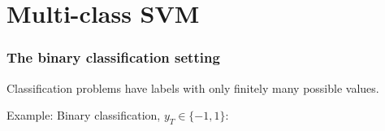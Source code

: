\section{Multi-class SVM}


\begin{frame}\frametitle{The binary classification setting}


Classification problems have labels with only finitely many possible values.

Example: Binary classification, $y_{T} \in \{-1,1\}$:


\end{frame}
